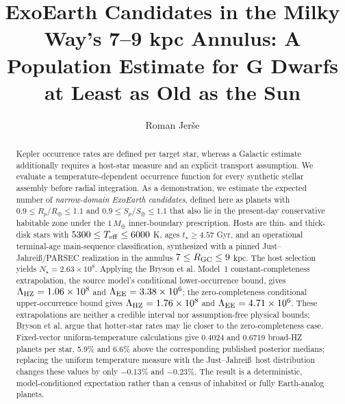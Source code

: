 \documentclass[twocolumn]{aastex631}
\newcommand{\Rearth}{R_{\oplus}}
\newcommand{\Mearth}{M_{\oplus}}
\newcommand{\Searth}{S_{\oplus}}
\newcommand{\Teff}{T_{\rm eff}}
\newcommand{\Rgc}{R_{\rm GC}}
\newcommand{\LamEE}{\Lambda_{\rm EE}}
\newcommand{\LamHZ}{\Lambda_{\rm HZ}}
\begin{document}

\title{ExoEarth Candidates in the Milky Way's 7--9 kpc Annulus: A Population Estimate for G Dwarfs at Least as Old as the Sun}

\author{Roman Jer\v{s}e}

\begin{abstract}
Kepler occurrence rates are defined per target star, whereas a Galactic estimate additionally requires a host-star measure and an explicit transport assumption. We evaluate a temperature-dependent occurrence function for every synthetic stellar assembly before radial integration. As a demonstration, we estimate the expected number of \emph{narrow-domain ExoEarth candidates}, defined here as planets with $0.9\leq R_p/\Rearth\leq1.1$ and $0.9\leq S_p/\Searth\leq1.1$ that also lie in the present-day conservative habitable zone under the $1\,\Mearth$ inner-boundary prescription. Hosts are thin- and thick-disk stars with $5300\leq\Teff\leq6000$ K, ages $t_\star\geq4.57$ Gyr, and an operational terminal-age main-sequence classification, synthesized with a pinned Just--Jahrei\ss/PARSEC realization in the annulus $7\leq\Rgc\leq9$ kpc. The host selection yields $N_\star=2.63\times10^8$. Applying the Bryson et al. Model~1 constant-completeness extrapolation, the source model's conditional lower-occurrence bound, gives $\LamHZ=1.06\times10^8$ and $\LamEE=3.38\times10^6$; the zero-completeness conditional upper-occurrence bound gives $\LamHZ=1.76\times10^8$ and $\LamEE=4.71\times10^6$. These extrapolations are neither a credible interval nor assumption-free physical bounds; Bryson et al. argue that hotter-star rates may lie closer to the zero-completeness case. Fixed-vector uniform-temperature calculations give 0.4024 and 0.6719 broad-HZ planets per star, 5.9\% and 6.6\% above the corresponding published posterior medians; replacing the uniform temperature measure with the Just--Jahrei\ss\ host distribution changes these values by only $-0.13\%$ and $-0.23\%$. The result is a deterministic, model-conditioned expectation rather than a census of inhabited or fully Earth-analog planets.
\end{abstract}
\end{document}
